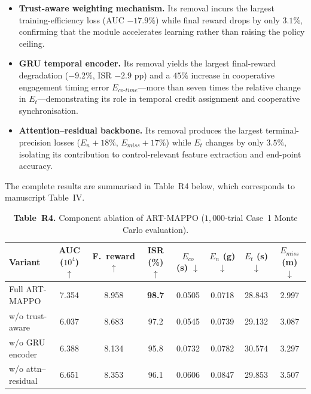 \documentclass[11pt]{article}
\begin{document}
\begin{itemize}
  \item \textbf{Trust-aware weighting mechanism.}  Its removal incurs the largest
    training-efficiency loss (AUC $-17.9\%$) while final reward drops by only
    $3.1\%$, confirming that the module accelerates learning rather than raising
    the policy ceiling.
  \item \textbf{GRU temporal encoder.}  Its removal yields the largest final-reward
    degradation ($-9.2\%$, ISR $-2.9$ pp) and a $45\%$ increase in cooperative
    engagement timing error $E_{co\text{-}time}$---more than seven times the
    relative change in $E_t$---demonstrating its role in temporal credit assignment
    and cooperative synchronisation.
  \item \textbf{Attention--residual backbone.}  Its removal produces the largest
    terminal-precision losses ($E_n\!+\!18\%$, $E_{miss}\!+\!17\%$) while $E_t$
    changes by only $3.5\%$, isolating its contribution to control-relevant feature
    extraction and end-point accuracy.
\end{itemize}

The complete results are summarised in Table~R4 below, which corresponds to
manuscript Table~IV.

\begin{table}[h]
\centering
\captionsetup{font=small}
\caption*{\small\textbf{Table~R4.} Component ablation of ART-MAPPO ($1{,}000$-trial
  Case~1 Monte Carlo evaluation).}
\renewcommand{\arraystretch}{1.12}
\setlength{\tabcolsep}{3pt}
\footnotesize
\begin{tabular}{lccccccc}
\hline\hline
Variant
  & AUC ($10^4$) $\uparrow$
  & F.\ reward $\uparrow$
  & ISR (\%) $\uparrow$
  & $E_{co}$ (s) $\downarrow$
  & $E_n$ (g) $\downarrow$
  & $E_t$ (s) $\downarrow$
  & $E_{miss}$ (m) $\downarrow$ \\ \hline
Full ART-MAPPO               & 7.354 & 8.958 & \textbf{98.7} & 0.0505 & 0.0718 & 28.843 & 2.997 \\
w/o trust-aware              & 6.037 & 8.683 & 97.2          & 0.0545 & 0.0739 & 29.132 & 3.087 \\
w/o GRU encoder              & 6.388 & 8.134 & 95.8          & 0.0732 & 0.0782 & 30.574 & 3.297 \\
w/o attn--residual           & 6.651 & 8.353 & 96.1          & 0.0606 & 0.0847 & 29.853 & 3.507 \\ \hline
\end{tabular}
\end{table}
\end{document}
